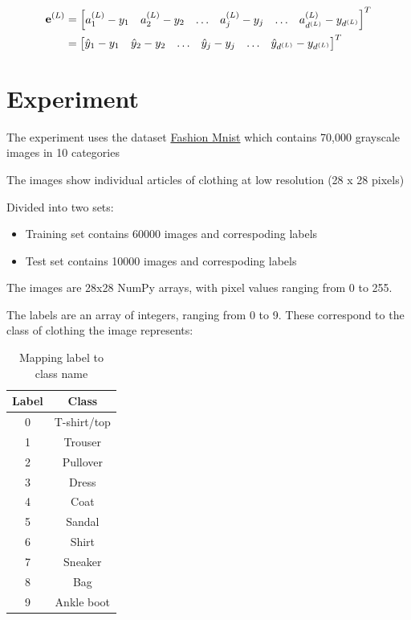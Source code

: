 \documentclass[14pt, a4paper]{article}
\numberwithin{equation}{section}
\numberwithin{algorithm}{section}
\numberwithin{figure}{section}
\begin{document}
\begin{equation}
  \begin{aligned}
    \bold{e}^{(L)}&=\begin{bmatrix} a_1^{(L)} - y_1 & a_2^{(L)} - y_2 & \dots & a_j^{(L)} - y_j & \dots & a_{d^{(L)}}^{(L)} - y_{d^{(L)}} \end{bmatrix}^T\\&=\begin{bmatrix} \hat{y}_1 - y_1 & \hat{y}_2 - y_2 & \dots & \hat{y}_j - y_j & \dots & \hat{y}_{d^{(L)}} - y_{d^{(L)}} \end{bmatrix}^T
  \end{aligned}
\end{equation}

\section{Experiment}

The experiment uses the dataset \href{https://github.com/zalandoresearch/fashion-mnist}{Fashion Mnist} which contains 70,000 grayscale images in 10 categories

The images show individual articles of clothing at low resolution (28 x 28 pixels)

Divided into two sets:
\begin{itemize}
	  \item Training set contains 60000 images and correspoding labels
		\item Test set contains 10000 images and correspoding labels
\end{itemize}

The images are 28x28 NumPy arrays, with pixel values ranging from 0 to 255. 
	
The labels are an array of integers, ranging from 0 to 9. These correspond to the class of clothing the image represents:

\begin{table} [h!]
  \centering
  \begin{tabular}{ || c | c  || }
  \hline
  Label & Class \\ [0.5 ex]
  \hline \hline
  0 & T-shirt/top \\ \hline
  1 & Trouser \\ \hline
  2 & Pullover \\ \hline
  3 & Dress \\ \hline
  4 & Coat \\ \hline
  5 & Sandal\\ \hline
  6 & Shirt\\ \hline 
  7 & Sneaker \\ \hline
  8 & Bag \\ \hline
  9 & Ankle boot \\ [1ex]
  \hline
  \end{tabular}
  \caption{Mapping label to class name}
\end{table}
\end{document}
